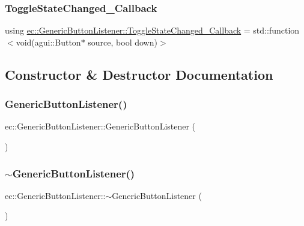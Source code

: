 \subsubsection{\texorpdfstring{Toggle\+State\+Changed\+\_\+\+Callback}{ToggleStateChanged\_Callback}}
{\footnotesize\ttfamily using \mbox{\hyperlink{classec_1_1_generic_button_listener_a528d9bd01250d4e2d7179ad64d67a364}{ec\+::\+Generic\+Button\+Listener\+::\+Toggle\+State\+Changed\+\_\+\+Callback}} =  std\+::function$<$void(agui\+::\+Button$\ast$ source, bool down)$>$}



\subsection{Constructor \& Destructor Documentation}
\mbox{\label{classec_1_1_generic_button_listener_acb6d403ce900c66f622fb52ebae32b49}} 
\subsubsection{\texorpdfstring{Generic\+Button\+Listener()}{GenericButtonListener()}}
{\footnotesize\ttfamily ec\+::\+Generic\+Button\+Listener\+::\+Generic\+Button\+Listener (\begin{DoxyParamCaption}{ }\end{DoxyParamCaption})\hspace{0.3cm}{\ttfamily [explicit]}}

\mbox{\label{classec_1_1_generic_button_listener_a1cfd5eba97748a8f0b41ef48d248299c}} 
\subsubsection{\texorpdfstring{$\sim$\+Generic\+Button\+Listener()}{~GenericButtonListener()}}
{\footnotesize\ttfamily ec\+::\+Generic\+Button\+Listener\+::$\sim$\+Generic\+Button\+Listener (\begin{DoxyParamCaption}{ }\end{DoxyParamCaption})\hspace{0.3cm}{\ttfamily [default]}}



